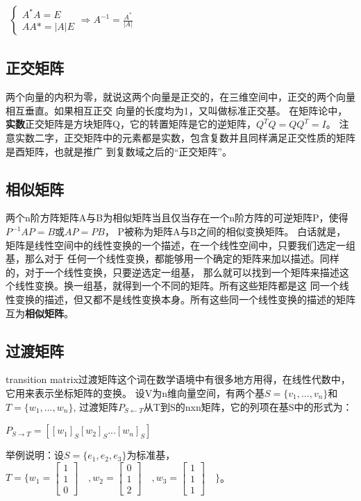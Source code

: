 \begin{math}
    \begin{aligned}
\begin{cases} A^*A=E\\ AA*=|A|E \end{cases} \Rightarrow A^{-1}=\frac{A^*}{|A|}
\end{aligned}
\end{math}


\subsection{正交矩阵}
两个向量的内积为零，就说这两个向量是正交的，在三维空间中，正交的两个向量相互垂直。如果相互正交
向量的长度均为1，又叫做标准正交基。
在矩阵论中，\textbf{实数}正交矩阵是方块矩阵Q，它的转置矩阵是它的逆矩阵，$Q^TQ=QQ^T=I$。
注意实数二字，正交矩阵中的元素都是实数，包含复数并且同样满足正交性质的矩阵是酉矩阵，也就是推广
到复数域之后的“正交矩阵”。

\subsection{相似矩阵}
两个n阶方阵矩阵A与B为相似矩阵当且仅当存在一个n阶方阵的可逆矩阵P，使得$P^{-1}AP=B$或$AP=PB$，
P被称为矩阵A与B之间的相似变换矩阵。
白话就是，矩阵是线性空间中的线性变换的一个描述，在一个线性空间中，只要我们选定一组基，那么对于
任何一个线性变换，都能够用一个确定的矩阵来加以描述。同样的，对于一个线性变换，只要逆选定一组基，
那么就可以找到一个矩阵来描述这个线性变换。换一组基，就得到一个不同的矩阵。所有这些矩阵都是这
同一个线性变换的描述，但又都不是线性变换本身。所有这些同一个线性变换的描述的矩阵互为\textbf{相似矩阵}。

\subsection{过渡矩阵}
transition matrix过渡矩阵这个词在数学语境中有很多地方用得，在线性代数中，它用来表示坐标矩阵的变换。
\newline
设V为n维向量空间，有两个基$S=\{v_1,...,v_n\}$和$T=\{w_1,...,w_n\}$,
过渡矩阵$P_{S \leftarrow T}$从T到S的nxn矩阵，它的列项在基S中的形式为：

\begin{math}
    P_{S \rightarrow T} = [[w_1]_S [w_2]_S ... [w_n]_S]
\end{math}

举例说明：设$S=\{ e_1,e_2,e_3\}$为标准基，$T=\{ w_1=\begin{bmatrix} 1\\ 1\\ 0 \end{bmatrix}\quad, w_2=\begin{bmatrix}0\\1\\2\end{bmatrix}\quad 
, w_3=\begin{bmatrix} 1\\1\\1 \end{bmatrix}\quad \}$。

